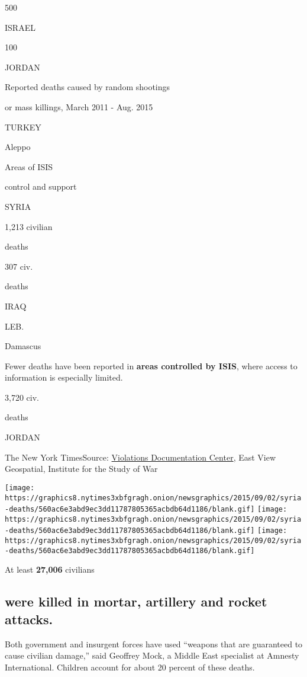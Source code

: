 500

ISRAEL

100

JORDAN

Reported deaths caused by random shootings

or mass killings, March 2011 - Aug. 2015

TURKEY

Aleppo

Areas of ISIS

control and support

SYRIA

1,213 civilian

deaths

307 civ.

deaths

IRAQ

LEB.

Damascus

Fewer deaths have been reported in \textbf{areas controlled by ISIS},
where access to information is especially limited.

3,720 civ.

deaths

JORDAN

The New York Times\textbar{}Source:
\href{https://www.vdc-sy.info/index.php/en/}{Violations Documentation
Center}, East View Geospatial, Institute for the Study of War

\texttt{[image: https://graphics8.nytimes3xbfgragh.onion/newsgraphics/2015/09/02/syria-deaths/560ac6e3abd9ec3dd11787805365acbdb64d1186/blank.gif]}
\texttt{[image: https://graphics8.nytimes3xbfgragh.onion/newsgraphics/2015/09/02/syria-deaths/560ac6e3abd9ec3dd11787805365acbdb64d1186/blank.gif]}
\texttt{[image: https://graphics8.nytimes3xbfgragh.onion/newsgraphics/2015/09/02/syria-deaths/560ac6e3abd9ec3dd11787805365acbdb64d1186/blank.gif]}

At least \textbf{27,006} civilians

\hypertarget{were-killed-in-mortar-artillery-and-rocket-attacks}{%
\subsection{were killed in mortar, artillery and rocket
attacks.}\label{were-killed-in-mortar-artillery-and-rocket-attacks}}

Both government and insurgent forces have used ``weapons that are
guaranteed to cause civilian damage,'' said Geoffrey Mock, a Middle East
specialist at Amnesty International. Children account for about 20
percent of these deaths.

